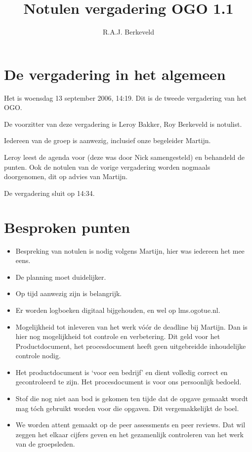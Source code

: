 \documentclass{article}
\title{Notulen vergadering OGO 1.1}
\author{R.A.J. Berkeveld}
\begin{document}
\maketitle


\section{De vergadering in het algemeen}

Het is woensdag 13 september 2006, 14:19. Dit is de tweede
vergadering van het OGO.

De voorzitter van deze vergadering is Leroy Bakker, Roy Berkeveld is
notulist.

Iedereen van de groep is aanwezig, inclusief onze begeleider
Martijn.

Leroy leest de agenda voor (deze was door Nick samengesteld) en
behandeld de punten. Ook de notulen van de vorige vergadering worden
nogmaals doorgenomen, dit op advies van Martijn.

De vergadering sluit op 14:34.


\section{Besproken punten}

\begin{itemize}
\item Bespreking van notulen is nodig volgens Martijn, hier was
iedereen het mee eens.

\item De planning moet duidelijker.

\item Op tijd aanwezig zijn is belangrijk.

\item Er worden logboeken digitaal bijgehouden, en wel op
lms.ogotue.nl.

\item Mogelijkheid tot inleveren van het werk v\'{o}\'{o}r de deadline bij
Martijn. Dan is hier nog mogelijkheid tot controle en verbetering.
Dit geld voor het Productdocument, het procesdocument heeft geen
uitgebreidde inhoudelijke controle nodig.

\item Het productdocument is `voor een bedrijf' en dient volledig
correct en gecontroleerd te zijn. Het procesdocument is voor ons
persoonlijk bedoeld.

\item Stof die nog niet aan bod is gekomen ten tijde dat de opgave
gemaakt wordt mag t\'{o}ch gebruikt worden voor die opgaven. Dit
vergemakkelijkt de boel.

\item We worden attent gemaakt op de peer assessments en peer reviews.
Dat wil zeggen het elkaar cijfers geven en het gezamenlijk
controleren van het werk van de groepsleden.
\end{itemize}
\end{document}
